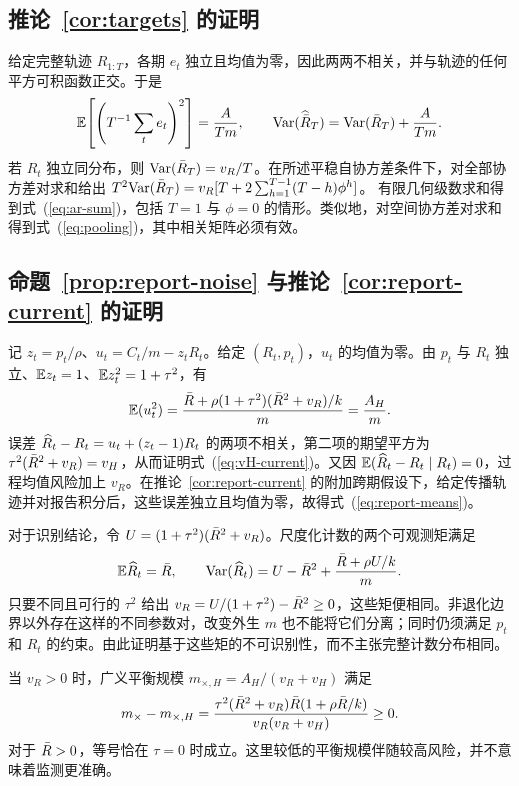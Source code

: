 \subsection{推论~\ref{cor:targets} 的证明}
\label{app:cor-targets}

给定完整轨迹 $R_{1:T}$，各期 $e_t$ 独立且均值为零，因此两两不相关，并与轨迹的任何平方可积函数正交。于是
\begin{equation}
 \mathbb{E}\!\left[\left(T^{-1}\sum_t e_t\right)^2\right]=\frac{A}{Tm},\qquad
 \mathrm{Var}(\widehat{\bar R}_T)=\mathrm{Var}(\bar R_T)+\frac{A}{Tm}.
\end{equation}
若 $R_t$ 独立同分布，则 $\mathrm{Var}(\bar R_T)=v_R/T$。在所述平稳自协方差条件下，对全部协方差对求和给出
$T^2\mathrm{Var}(\bar R_T)=v_R[T+2\sum_{h=1}^{T-1}(T-h)\phi^h]$。
有限几何级数求和得到式~(\ref{eq:ar-sum})，包括 $T=1$ 与 $\phi=0$ 的情形\citep{hamilton1994time}。类似地，对空间协方差对求和得到式~(\ref{eq:pooling})，其中相关矩阵必须有效。

\subsection{命题~\ref{prop:report-noise} 与推论~\ref{cor:report-current} 的证明}
\label{app:prop2}
\label{app:cor-report-current}

记 $z_t=p_t/\rho$、$u_t=C_t/m-z_tR_t$。给定 $(R_t,p_t)$，$u_t$ 的均值为零。由 $p_t$ 与 $R_t$ 独立、$\mathbb{E} z_t=1$、$\mathbb{E} z_t^2=1+\tau^2$，有
\begin{equation}
 \mathbb{E}(u_t^2)=\frac{\bar R+\rho(1+\tau^2)(\bar R^2+v_R)/k}{m}
 =\frac{A_H}{m}.
\end{equation}
误差 $\widehat R_t-R_t=u_t+(z_t-1)R_t$ 的两项不相关，第二项的期望平方为 $\tau^2(\bar R^2+v_R)=v_H$，从而证明式~(\ref{eq:vH-current})。又因 $\mathbb{E}(\widehat R_t-R_t\mid R_t)=0$，过程均值风险加上 $v_R$。在推论~\ref{cor:report-current} 的附加跨期假设下，给定传播轨迹并对报告积分后，这些误差独立且均值为零，故得式~(\ref{eq:report-means})。

对于识别结论，令 $U=(1+\tau^2)(\bar R^2+v_R)$。尺度化计数的两个可观测矩满足
\begin{equation}
 \mathbb{E}\widehat R_t=\bar R,\qquad
 \mathrm{Var}(\widehat R_t)=U-\bar R^2+\frac{\bar R+\rho U/k}{m}.
 \label{eq:moment-identification}
\end{equation}
只要不同且可行的 $\tau^2$ 给出 $v_R=U/(1+\tau^2)-\bar R^2\ge0$，这些矩便相同。非退化边界以外存在这样的不同参数对，改变外生 $m$ 也不能将它们分离；同时仍须满足 $p_t$ 和 $R_t$ 的约束。由此证明基于这些矩的不可识别性，而不主张完整计数分布相同。

当 $v_R>0$ 时，广义平衡规模 $m_{\times,H}=A_H/(v_R+v_H)$ 满足
\begin{equation}
 m_{\times}-m_{\times,H}
 =\frac{\tau^2(\bar R^2+v_R)\bar R(1+\rho\bar R/k)}{v_R(v_R+v_H)}\ge0.
 \label{eq:mx-gap}
\end{equation}
对于 $\bar R>0$，等号恰在 $\tau=0$ 时成立。这里较低的平衡规模伴随较高风险，并不意味着监测更准确。

